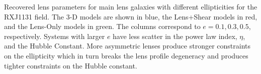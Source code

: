\label{fig:ecompare} Recovered lens parameters for main lens galaxies with different ellipticities for the RXJ1131 field. The 3-D models are shown in blue, the Lens+Shear models in red, and the Lens-Only models in green. The columns correspond to $e = 0.1,0.3,0.5$, respectively. Systems with larger $e$ have less scatter in the power law index, $\eta$, and the Hubble Constant. More asymmetric lenses produce stronger constraints on the ellipticity which in turn breaks the lens profile degeneracy and produces tighter constraints on the Hubble constant. 